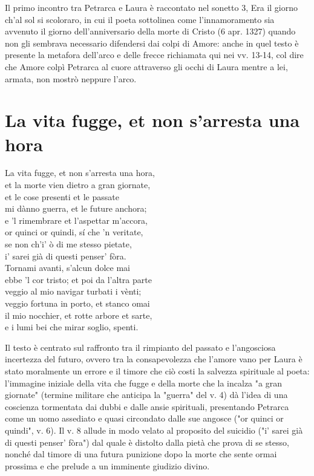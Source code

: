 \documentclass[10pt,a4paper]{article}
\begin{document}
Il primo incontro tra Petrarca e Laura è raccontato nel sonetto 3, Era il giorno ch'al sol si scoloraro, in cui il poeta sottolinea come l'innamoramento sia avvenuto il giorno dell'anniversario della morte di Cristo (6 apr. 1327) quando non gli sembrava necessario difendersi dai colpi di Amore: anche in quel testo è presente la metafora dell'arco e delle frecce richiamata qui nei vv. 13-14, col dire che Amore colpì Petrarca al cuore attraverso gli occhi di Laura mentre a lei, armata, non mostrò neppure l'arco.

\section{La vita fugge, et non s'arresta una hora}

\begin{estratto}
	La vita fugge, et non s’arresta una hora,\\
	et la morte vien dietro a gran giornate,\\
	et le cose presenti et le passate\\
	mi dànno guerra, et le future anchora;\\
	
	e ’l rimembrare et l’aspettar m’accora,\\
	or quinci or quindi, sí che ’n veritate,\\
	se non ch’i’ ò di me stesso pietate,\\
	i’ sarei già di questi penser’ fòra.\\
	
	Tornami avanti, s’alcun dolce mai\\
	ebbe ’l cor tristo; et poi da l’altra parte\\
	veggio al mio navigar turbati i vènti;\\
	
	veggio fortuna in porto, et stanco omai\\
	il mio nocchier, et rotte arbore et sarte,\\
	e i lumi bei che mirar soglio, spenti.\\
\end{estratto}

Il testo è centrato sul raffronto tra il rimpianto del passato e l'angosciosa incertezza del futuro, ovvero tra la consapevolezza che l'amore vano per Laura è stato moralmente un errore e il timore che ciò costi la salvezza spirituale al poeta: l'immagine iniziale della vita che fugge e della morte che la incalza "a gran giornate" (termine militare che anticipa la "guerra" del v. 4) dà l'idea di una coscienza tormentata dai dubbi e dalle ansie spirituali, presentando Petrarca come un uomo assediato e quasi circondato dalle sue angosce ("or quinci or quindi", v. 6). Il v. 8 allude in modo velato al proposito del suicidio ("i’ sarei già di questi penser’ fòra") dal quale è distolto dalla pietà che prova di se stesso, nonché dal timore di una futura punizione dopo la morte che sente ormai prossima e che prelude a un imminente giudizio divino.
\end{document}
